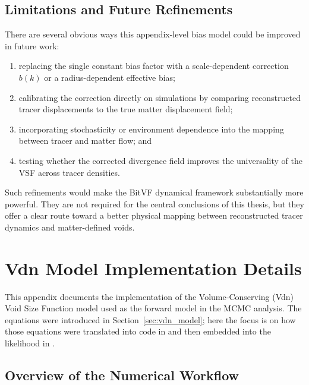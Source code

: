 \documentclass[12pt]{report}
\begin{document}
\section{Limitations and Future Refinements}

There are several obvious ways this appendix-level bias model could be improved in future work:
\begin{enumerate}
    \item replacing the single constant bias factor with a scale-dependent correction $b(k)$ or a radius-dependent effective bias;
    \item calibrating the correction directly on simulations by comparing reconstructed tracer displacements to the true matter displacement field;
    \item incorporating stochasticity or environment dependence into the mapping between tracer and matter flow; and
    \item testing whether the corrected divergence field improves the universality of the VSF across tracer densities.
\end{enumerate}

Such refinements would make the BitVF dynamical framework substantially more powerful. They are not required for the central conclusions of this thesis, but they offer a clear route toward a better physical mapping between reconstructed tracer dynamics and matter-defined voids.


\chapter{Vdn Model Implementation Details}
\label{app:vdn_implementation}

This appendix documents the implementation of the Volume-Conserving (Vdn) Void Size Function model used as the forward model in the MCMC analysis. The equations were introduced in Section~\ref{sec:vdn_model}; here the focus is on how those equations were translated into code in  and then embedded into the likelihood in .

\section{Overview of the Numerical Workflow}
\end{document}
